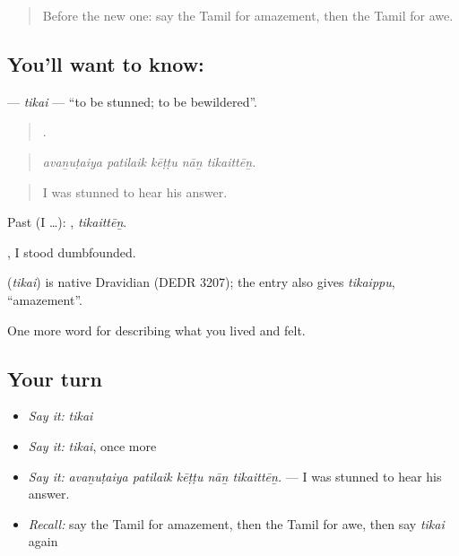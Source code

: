 \label{lesson:TA-C460-tikai}



\begin{quote}
Before the new one: say the Tamil for amazement, then the Tamil for awe.
\end{quote}

\subsection*{You'll want to know: }
\textbf{} — \emph{tikai} — \textquotedblleft{}to be stunned; to be bewildered\textquotedblright{}.

\begin{quote}
    .
\end{quote}

\begin{quote}
\emph{avaṉuṭaiya patilaik kēṭṭu nāṉ tikaittēṉ.}
\end{quote}

\begin{quote}
I was stunned to hear his answer.
\end{quote}

Past (I …): , \emph{tikaittēṉ}.

 , I stood dumbfounded.

\begin{cousinweb}
\textbf{} (\emph{tikai}) is native Dravidian (DEDR 3207); the entry also gives  \emph{tikaippu}, \textquotedblleft{}amazement\textquotedblright{}.
\end{cousinweb}

\begin{grammarlens}[title={What you've built}]
One more word for describing what you lived and felt.
\end{grammarlens}

\subsection*{Your turn}
\begin{itemize}
\raggedright
  \item \emph{Say it:} \emph{tikai}
  \item \emph{Say it:} \emph{tikai}, once more
  \item \emph{Say it:} \emph{avaṉuṭaiya patilaik kēṭṭu nāṉ tikaittēṉ.} — I was stunned to hear his answer.
  \item \emph{Recall:} say the Tamil for amazement, then the Tamil for awe, then say \emph{tikai} again
\end{itemize}

